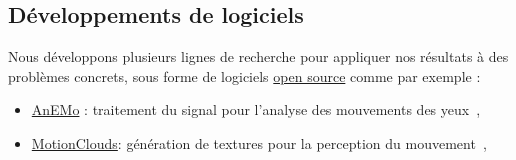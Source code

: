 \documentclass[10pt,french,a4paper]{article}%
\begin{document}
\subsection{Développements de logiciels} %

Nous développons plusieurs lignes de recherche pour appliquer nos résultats à des problèmes concrets, sous forme de logiciels \href{https://laurentperrinet.github.io/project/open-science/}{open source} comme par exemple :

\begin{itemize}

	\item \href{https://github.com/invibe/AnEMo}{AnEMo} : traitement du signal pour l'analyse des mouvements des yeux~\citep{Pasturel18anemo},
	\item \href{http://github.com/NeuralEnsemble/MotionClouds}{MotionClouds}: génération de textures pour la perception du mouvement~\citep{Sanz12,Vacher15nips,Vacher16},


\end{itemize}
\end{document}
